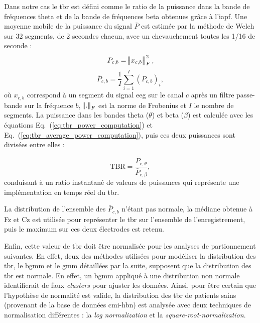 Dans notre cas le \gls{tbr} est défini comme le ratio de la puissance dans la bande de fréquences theta et de la bande de fréquences beta obtenues 
grâce à l'\gls{iapf}. Une moyenne mobile de la puissance du signal $\bar{P}$ est estimée par la méthode de Welch \citep{Welch1967} sur 32 segments, de 2 secondes chacun, avec un 
chevauchement toutes les 1/16 de seconde :
\begin{equation}
\label{eq:tbr_power_computation}
P_{c,b} = \norm{ x_{c,b} }_{F}^2,
\end{equation}
\begin{equation}
\label{eq:tbr_average_power_computation}
\bar{P}_{c,b} = \frac{1}{I} \sum_{i=1}^{I} (P_{c,b})_{i},
\end{equation}
où $x_{c,b}$ correspond à un segment du signal \gls{eeg} sur le canal $c$ après un filtre passe-bande sur la fréquence $b$, $\norm{.}_{F}$ est la norme de Frobenius et $I$ 
le nombre de segments. La puissance dans les bandes theta ($\theta$) et beta ($\beta$) est calculée avec les équations Eq.~(\ref{eq:tbr_power_computation}) et Eq.~(\ref{eq:tbr_average_power_computation}),
puis ces deux puissances sont divisées entre elles :

\begin{equation}
\label{eq:tbr_tbr_computation}
\text{TBR} = \frac{\bar{P}_{c,\theta}}{\bar{P}_{c,\beta}},
\end{equation}
conduisant à un ratio instantané de valeurs de puissances qui représente une implémentation en temps réel du \gls{tbr}.

La distribution de l'ensemble des $\bar{P}_{c,b}$ n'étant pas normale, la médiane obtenue à Fz et Cz est utilisée pour représenter le \gls{tbr} sur l'ensemble 
de l'enregistrement, puis le maximum sur ces deux électrodes est retenu.

Enfin, cette valeur de \gls{tbr} doit être normalisée pour les analyses de partionnement suivantes. En effet, deux des méthodes utilisées pour modéliser la distribution des \gls{tbr},
le \gls{bgmm} et le \gls{gmm} détaillées par la suite, supposent que la distribution des \gls{tbr} est normale. 
En effet, un \gls{bgmm} appliqué à une distribution non normale identifierait de faux \textit{clusters} pour ajuster les données. 
Ainsi, pour être certain que l'hypothèse de normalité est valide, la distribution des \gls{tbr} de patients sains (provenant de la base de données \gls{cmi-hbn})
est analysée avec deux techniques de normalisation différentes : la \textit{log normalization} et la \textit{square-root-normalization}.

